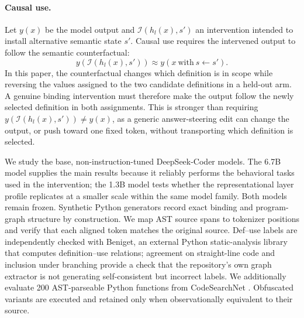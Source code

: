 \documentclass{article}
\begin{document}
\paragraph{Causal use.}
Let $y(x)$ be the model output and $\mathcal{I}(h_l(x),s')$ an intervention intended to install alternative semantic state $s'$. Causal use requires the intervened output to follow the semantic counterfactual:
\begin{equation}
  y\!\left(\mathcal{I}(h_l(x),s')\right)
  \approx
  y\!\left(x\ \text{with}\ s\leftarrow s'\right).
  \label{eq:causal-use}
\end{equation}
In this paper, the counterfactual changes which definition is in scope while reversing the values assigned to the two candidate definitions in a held-out arm. A genuine binding intervention must therefore make the output follow the newly selected definition in both assignments. This is stronger than requiring $y(\mathcal{I}(h_l(x),s'))\neq y(x)$, as a generic answer-steering edit can change the output, or push toward one fixed token, without transporting which definition is selected.

We study the base, non-instruction-tuned DeepSeek-Coder models. The 6.7B model supplies the main results because it reliably performs the behavioral tasks used in the intervention; the 1.3B model tests whether the representational layer profile replicates at a smaller scale within the same model family. Both models remain frozen. Synthetic Python generators record exact binding and program-graph structure by construction. We map AST source spans to tokenizer positions and verify that each aligned token matches the original source. Def--use labels are independently checked with Beniget, an external Python static-analysis library that computes definition--use relations; agreement on straight-line code and inclusion under branching provide a check that the repository's own graph extractor is not generating self-consistent but incorrect labels. We additionally evaluate 200 AST-parseable Python functions from CodeSearchNet \citep{husain2019codesearchnet}. Obfuscated variants are executed and retained only when observationally equivalent to their source.
\end{document}
